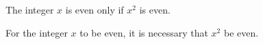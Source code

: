 \begin{list}{\bf{\ref{exer:sec22-8}.}} 
%
%
%
\item \begin{list}{\bf{(c)}} 
\item The integer  $x$  is even only if $x^2$   is even.
\end{list}
\end{list}


\begin{list}{} 
\item \begin{list}{\bf{(d)}} 
\item For the integer $x$ to be even, it is necessary that $x^2$ be even.  %
\end{list}
\end{list}



